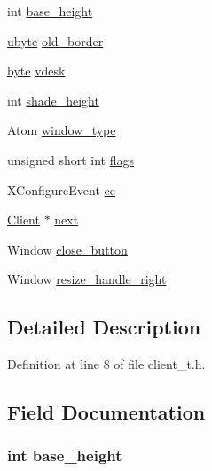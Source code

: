 \begin{DoxyCompactItemize}
\item 
int \hyperlink{struct_client_aff89676c1539238d8a01bbf97803b59e}{base\_\-height}
\item 
\hyperlink{arwm_8h_a5dd4f281954ce1405c92d62a427f839a}{ubyte} \hyperlink{struct_client_a80fc22c63df11c422930f6a4157edf79}{old\_\-border}
\item 
\hyperlink{arwm_8h_a2b7e7856b48ec3327148ac994ad95cd5}{byte} \hyperlink{struct_client_a6598db9e547ecfb0412173ed101b82ed}{vdesk}
\item 
int \hyperlink{struct_client_a95840475e96e04931b1f5f0d2d38fad2}{shade\_\-height}
\item 
Atom \hyperlink{struct_client_a4849f7533c04f5c569887d2bb97258ff}{window\_\-type}
\item 
unsigned short int \hyperlink{struct_client_ae718cba7f740adbac78a900ce25b73af}{flags}
\item 
XConfigureEvent \hyperlink{struct_client_ae0ec354a175554aba466bf324c8dd491}{ce}
\item 
\hyperlink{struct_client}{Client} $\ast$ \hyperlink{struct_client_a91333367c3890374bf930ff44f4d3089}{next}
\item 
Window \hyperlink{struct_client_a821bbd825717f458f5aaa2f05268eb4d}{close\_\-button}
\item 
Window \hyperlink{struct_client_aec1bb9007613e9ffd447a4ae4d1e89ff}{resize\_\-handle\_\-right}
\end{DoxyCompactItemize}


\subsection{Detailed Description}


Definition at line 8 of file client\_\-t.h.



\subsection{Field Documentation}
\hypertarget{struct_client_aff89676c1539238d8a01bbf97803b59e}{
\subsubsection[{base\_\-height}]{\setlength{\rightskip}{0pt plus 5cm}int {\bf base\_\-height}}}
\label{struct_client_aff89676c1539238d8a01bbf97803b59e}


